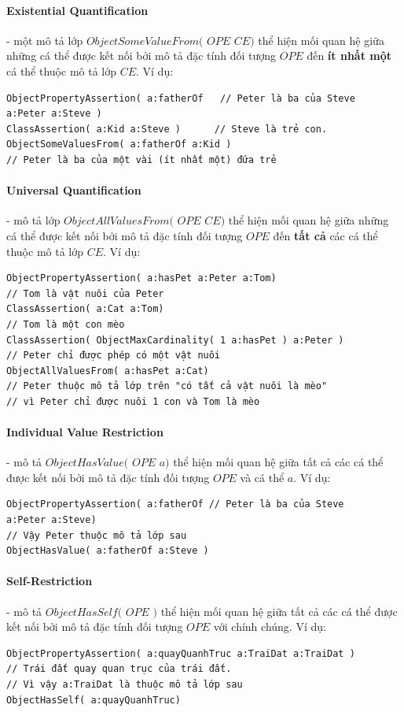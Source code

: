\paragraph{Existential Quantification} - một mô tả lớp $ObjectSomeValueFrom($ $OPE$ $CE)$ thể hiện mối quan hệ giữa những cá thể được kết nối bởi mô tả đặc tính đối tượng $OPE$ đến \textbf{ít nhất một} cá thể thuộc mô tả lớp $CE$. Ví dụ:
\begin{verbatim}
ObjectPropertyAssertion( a:fatherOf   // Peter là ba của Steve
a:Peter a:Steve )                     
ClassAssertion( a:Kid a:Steve )      // Steve là trẻ con.
ObjectSomeValuesFrom( a:fatherOf a:Kid ) 
// Peter là ba của một vài (ít nhất một) đứa trẻ
\end{verbatim} 

\paragraph{Universal Quantification} - mô tả lớp $ObjectAllValuesFrom($ $OPE$ $CE)$ thể hiện mối quan hệ giữa những cá thể được kết nối bởi mô tả đặc tính đối tượng $OPE$ đến \textbf{tất cả} các cá thể thuộc mô tả lớp $CE$. Ví dụ: 
\begin{verbatim}
ObjectPropertyAssertion( a:hasPet a:Peter a:Tom)
// Tom là vật nuôi của Peter
ClassAssertion( a:Cat a:Tom) 
// Tom là một con mèo
ClassAssertion( ObjectMaxCardinality( 1 a:hasPet ) a:Peter )
// Peter chỉ được phép có một vật nuôi
ObjectAllValuesFrom( a:hasPet a:Cat)
// Peter thuộc mô tả lớp trên "có tất cả vật nuôi là mèo" 
// vì Peter chỉ được nuôi 1 con và Tom là mèo
\end{verbatim}

\paragraph{Individual Value Restriction} - mô tả  $ObjectHasValue($ $OPE$ $a)$ thể hiện mối quan hệ giữa tất cả các cá thể được kết nối bởi mô tả đặc tính đối tượng $OPE$ và cá thể $a$. Ví dụ:
\begin{verbatim}
ObjectPropertyAssertion( a:fatherOf // Peter là ba của Steve
a:Peter a:Steve)
// Vậy Peter thuộc mô tả lớp sau
ObjectHasValue( a:fatherOf a:Steve )
\end{verbatim}

\paragraph{Self-Restriction} - mô tả $ObjectHasSelf($ $OPE$ $)$ thể hiện mối quan hệ giữa tất cả các cá thể được kết nối bởi mô tả đặc tính đối tượng $OPE$ với chính chúng. Ví dụ:
\begin{verbatim}
ObjectPropertyAssertion( a:quayQuanhTruc a:TraiDat a:TraiDat )	
// Trái đất quay quan trục của trái đất.
// Vì vậy a:TraiDat là thuộc mô tả lớp sau
ObjectHasSelf( a:quayQuanhTruc)
\end{verbatim}

